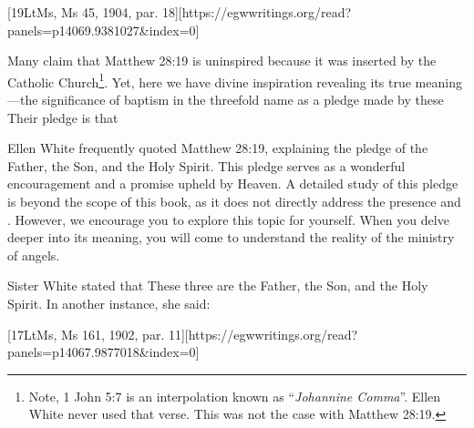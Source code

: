 [19LtMs, Ms 45, 1904, par. 18][https://egwwritings.org/read?panels=p14069.9381027&index=0]

Many claim that Matthew 28:19 is uninspired because it was inserted by the Catholic Church\footnote{Note, 1 John 5:7  is an interpolation known as “\textit{Johannine Comma}”. Ellen White never used that verse. This was not the case with Matthew 28:19.}. Yet, here we have divine inspiration revealing its true meaning—the significance of baptism in the threefold name as a pledge made by these  Their pledge is that 

Ellen White frequently quoted Matthew 28:19, explaining the pledge of the Father, the Son, and the Holy Spirit. This pledge serves as a wonderful encouragement and a promise upheld by Heaven. A detailed study of this pledge is beyond the scope of this book, as it does not directly address the presence and . However, we encourage you to explore this topic for yourself. When you delve deeper into its meaning, you will come to understand the reality of the ministry of angels.

Sister White stated that  These three are the Father, the Son, and the Holy Spirit. In another instance, she said:

[17LtMs, Ms 161, 1902, par. 11][https://egwwritings.org/read?panels=p14067.9877018&index=0]


